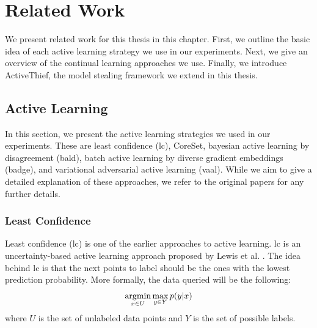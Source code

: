 
\chapter{Related Work}
\label{ch:Related_work}
We present related work for this thesis in this chapter. First, we outline the basic idea of each active learning strategy we
use in our experiments. Next, we give an overview of the continual learning approaches we use. Finally, we introduce ActiveThief, the
model stealing framework we extend in this thesis.


\section{Active Learning}
\label{sec:Related_work:Active_Learning}
In this section, we present the active learning strategies we used in our experiments. These are least confidence
(\gls{lc}), CoreSet, bayesian active learning by disagreement (\gls{bald}), batch active learning by diverse gradient embeddings (\gls{badge}), and 
variational adversarial active learning (\gls{vaal}). While we aim to give a detailed explanation of these approaches, we refer to the
original papers for any further details. \par

\subsection{Least Confidence}
\label{sec:Related_work:Active_Learning:Least_Confidence}
Least confidence (\gls{lc}) is one of the earlier approaches to active learning. \gls{lc} is an uncertainty-based active learning
approach proposed by Lewis et al. \cite{lewis1995sequential}. The idea behind \gls{lc} is that the next points to label should be the 
ones with the lowest prediction probability. More formally, the data queried will be the following:
\begin{equation}
    \operatorname*{\arg\!\min}_{x \in U} \max_{y \in Y} p(y|x)
\end{equation}
where $U$ is the set of unlabeled data points and $Y$ is the set of possible labels. \par


